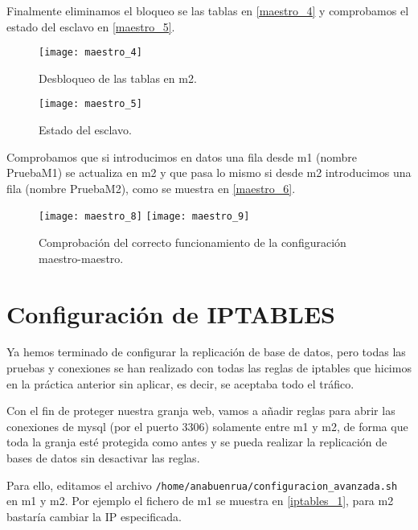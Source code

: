 Finalmente eliminamos el bloqueo se las tablas en \eqref{maestro_4} y comprobamos el estado del esclavo en \eqref{maestro_5}.

\begin{figure}[h!]
\begin{center}
\caption{Desbloqueo de las tablas en m2.}
\label{maestro_4}
\texttt{[image: maestro\_4]}
\end{center}
\end{figure}

\begin{figure}[h!]
\begin{center}
\caption{Estado del esclavo.}
\label{maestro_5}
\texttt{[image: maestro\_5]}
\end{center}
\end{figure}

Comprobamos que si introducimos en datos una fila desde m1 (nombre PruebaM1) se actualiza en m2 y que pasa lo mismo si desde m2 introducimos una fila (nombre PruebaM2), como se muestra en \eqref{maestro_6}.

\begin{figure}[h!]
\begin{center}
\caption{Comprobación del correcto funcionamiento de la configuración maestro-maestro.}
\label{maestro_6}
\texttt{[image: maestro\_8]}
\texttt{[image: maestro\_9]}
\end{center}
\end{figure}


\chapter{Configuración de IPTABLES}

Ya hemos terminado de configurar la replicación de base de datos, pero todas las pruebas y conexiones se han realizado con todas las reglas de iptables que hicimos en la práctica anterior sin aplicar, es decir, se aceptaba todo el tráfico.

Con el fin de proteger nuestra granja web, vamos a añadir reglas para abrir las conexiones de mysql (por el puerto 3306) solamente entre m1 y m2, de forma que toda la granja esté protegida como antes y se pueda realizar la replicación de bases de datos sin desactivar las reglas.

Para ello, editamos el archivo \verb|/home/anabuenrua/configuracion_avanzada.sh| en m1 y m2. Por ejemplo el fichero de m1 se muestra en \eqref{iptables_1}, para m2 bastaría cambiar la IP especificada.


